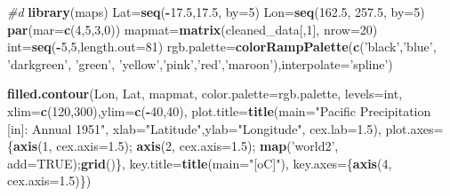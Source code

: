 \documentclass[]{article}
\newenvironment{Shaded}{\begin{snugshade}}{\end{snugshade}}
\newcommand{\KeywordTok}[1]{\textcolor[rgb]{0.13,0.29,0.53}{\textbf{#1}}}
\newcommand{\DataTypeTok}[1]{\textcolor[rgb]{0.13,0.29,0.53}{#1}}
\newcommand{\DecValTok}[1]{\textcolor[rgb]{0.00,0.00,0.81}{#1}}
\newcommand{\FloatTok}[1]{\textcolor[rgb]{0.00,0.00,0.81}{#1}}
\newcommand{\StringTok}[1]{\textcolor[rgb]{0.31,0.60,0.02}{#1}}
\newcommand{\CommentTok}[1]{\textcolor[rgb]{0.56,0.35,0.01}{\textit{#1}}}
\newcommand{\OtherTok}[1]{\textcolor[rgb]{0.56,0.35,0.01}{#1}}
\newcommand{\OperatorTok}[1]{\textcolor[rgb]{0.81,0.36,0.00}{\textbf{#1}}}
\newcommand{\NormalTok}[1]{#1}
\begin{document}
\begin{Shaded}
\begin{Highlighting}[]
\CommentTok{#d}
\KeywordTok{library}\NormalTok{(maps)}
\NormalTok{Lat=}\KeywordTok{seq}\NormalTok{(}\OperatorTok{-}\FloatTok{17.5}\NormalTok{,}\FloatTok{17.5}\NormalTok{, }\DataTypeTok{by=}\DecValTok{5}\NormalTok{)}
\NormalTok{Lon=}\KeywordTok{seq}\NormalTok{(}\FloatTok{162.5}\NormalTok{, }\FloatTok{257.5}\NormalTok{, }\DataTypeTok{by=}\DecValTok{5}\NormalTok{)}
\KeywordTok{par}\NormalTok{(}\DataTypeTok{mar=}\KeywordTok{c}\NormalTok{(}\DecValTok{4}\NormalTok{,}\DecValTok{5}\NormalTok{,}\DecValTok{3}\NormalTok{,}\DecValTok{0}\NormalTok{))}
\NormalTok{mapmat=}\KeywordTok{matrix}\NormalTok{(cleaned_data[,}\DecValTok{1}\NormalTok{], }\DataTypeTok{nrow=}\DecValTok{20}\NormalTok{)}
\NormalTok{int=}\KeywordTok{seq}\NormalTok{(}\OperatorTok{-}\DecValTok{5}\NormalTok{,}\DecValTok{5}\NormalTok{,}\DataTypeTok{length.out=}\DecValTok{81}\NormalTok{)}
\NormalTok{rgb.palette=}\KeywordTok{colorRampPalette}\NormalTok{(}\KeywordTok{c}\NormalTok{(}\StringTok{'black'}\NormalTok{,}\StringTok{'blue'}\NormalTok{, }\StringTok{'darkgreen'}\NormalTok{,}
                               \StringTok{'green'}\NormalTok{, }\StringTok{'yellow'}\NormalTok{,}\StringTok{'pink'}\NormalTok{,}\StringTok{'red'}\NormalTok{,}\StringTok{'maroon'}\NormalTok{),}\DataTypeTok{interpolate=}\StringTok{'spline'}\NormalTok{)}

\KeywordTok{filled.contour}\NormalTok{(Lon, Lat, mapmat, }\DataTypeTok{color.palette=}\NormalTok{rgb.palette, }\DataTypeTok{levels=}\NormalTok{int,}
               \DataTypeTok{xlim=}\KeywordTok{c}\NormalTok{(}\DecValTok{120}\NormalTok{,}\DecValTok{300}\NormalTok{),}\DataTypeTok{ylim=}\KeywordTok{c}\NormalTok{(}\OperatorTok{-}\DecValTok{40}\NormalTok{,}\DecValTok{40}\NormalTok{),}
               \DataTypeTok{plot.title=}\KeywordTok{title}\NormalTok{(}\DataTypeTok{main=}\StringTok{"Pacific Precipitation [in]: Annual 1951"}\NormalTok{,}
                                \DataTypeTok{xlab=}\StringTok{"Latitude"}\NormalTok{,}\DataTypeTok{ylab=}\StringTok{"Longitude"}\NormalTok{, }\DataTypeTok{cex.lab=}\FloatTok{1.5}\NormalTok{),}
               \DataTypeTok{plot.axes=}\NormalTok{\{}\KeywordTok{axis}\NormalTok{(}\DecValTok{1}\NormalTok{, }\DataTypeTok{cex.axis=}\FloatTok{1.5}\NormalTok{); }\KeywordTok{axis}\NormalTok{(}\DecValTok{2}\NormalTok{, }\DataTypeTok{cex.axis=}\FloatTok{1.5}\NormalTok{);}
                 \KeywordTok{map}\NormalTok{(}\StringTok{'world2'}\NormalTok{, }\DataTypeTok{add=}\OtherTok{TRUE}\NormalTok{);}\KeywordTok{grid}\NormalTok{()\},}
               \DataTypeTok{key.title=}\KeywordTok{title}\NormalTok{(}\DataTypeTok{main=}\StringTok{"[oC]"}\NormalTok{),}
               \DataTypeTok{key.axes=}\NormalTok{\{}\KeywordTok{axis}\NormalTok{(}\DecValTok{4}\NormalTok{, }\DataTypeTok{cex.axis=}\FloatTok{1.5}\NormalTok{)\})}
\end{Highlighting}
\end{Shaded}
\end{document}
